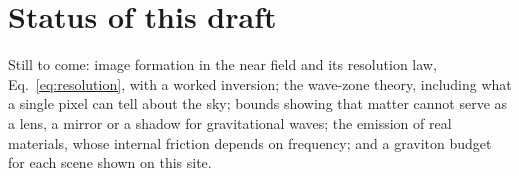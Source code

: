 \section{Status of this draft}\label{sec:status}

Still to come: image formation in the near field and its resolution law,
Eq.~\eqref{eq:resolution}, with a worked inversion; the wave-zone theory,
including what a single pixel can tell about the sky; bounds showing that
matter cannot serve as a lens, a mirror or a shadow for gravitational waves;
the emission of real materials, whose internal friction depends on frequency;
and a graviton budget for each scene shown on this site.
